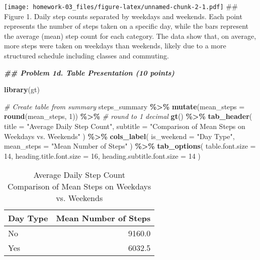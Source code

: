 \documentclass[
]{article}
\newenvironment{Shaded}{\begin{snugshade}}{\end{snugshade}}
\newcommand{\AttributeTok}[1]{\textcolor[rgb]{0.13,0.29,0.53}{#1}}
\newcommand{\CommentTok}[1]{\textcolor[rgb]{0.56,0.35,0.01}{\textit{#1}}}
\newcommand{\DecValTok}[1]{\textcolor[rgb]{0.00,0.00,0.81}{#1}}
\newcommand{\DocumentationTok}[1]{\textcolor[rgb]{0.56,0.35,0.01}{\textbf{\textit{#1}}}}
\newcommand{\FunctionTok}[1]{\textcolor[rgb]{0.13,0.29,0.53}{\textbf{#1}}}
\newcommand{\NormalTok}[1]{#1}
\newcommand{\SpecialCharTok}[1]{\textcolor[rgb]{0.81,0.36,0.00}{\textbf{#1}}}
\newcommand{\StringTok}[1]{\textcolor[rgb]{0.31,0.60,0.02}{#1}}
\begin{document}
\texttt{[image: homework-03\_files/figure-latex/unnamed-chunk-2-1.pdf]}
\#\# Figure 1. Daily step counts separated by weekdays and weekends.
Each point represents the number of steps taken on a specific day, while
the bars represent the average (mean) step count for each category. The
data show that, on average, more steps were taken on weekdays than
weekends, likely due to a more structured schedule including classes and
commuting.

\begin{Shaded}
\begin{Highlighting}[]
\DocumentationTok{\#\# Problem 1d. Table Presentation (10 points)}

\FunctionTok{library}\NormalTok{(gt)}

\CommentTok{\# Create table from summary}
\NormalTok{steps\_summary }\SpecialCharTok{\%\textgreater{}\%}
  \FunctionTok{mutate}\NormalTok{(}\AttributeTok{mean\_steps =} \FunctionTok{round}\NormalTok{(mean\_steps, }\DecValTok{1}\NormalTok{)) }\SpecialCharTok{\%\textgreater{}\%}  \CommentTok{\# round to 1 decimal}
  \FunctionTok{gt}\NormalTok{() }\SpecialCharTok{\%\textgreater{}\%}
  \FunctionTok{tab\_header}\NormalTok{(}
    \AttributeTok{title =} \StringTok{"Average Daily Step Count"}\NormalTok{,}
    \AttributeTok{subtitle =} \StringTok{"Comparison of Mean Steps on Weekdays vs. Weekends"}
\NormalTok{  ) }\SpecialCharTok{\%\textgreater{}\%}
  \FunctionTok{cols\_label}\NormalTok{(}
    \AttributeTok{is\_weekend =} \StringTok{"Day Type"}\NormalTok{,}
    \AttributeTok{mean\_steps =} \StringTok{"Mean Number of Steps"}
\NormalTok{  ) }\SpecialCharTok{\%\textgreater{}\%}
  \FunctionTok{tab\_options}\NormalTok{(}
    \AttributeTok{table.font.size =} \DecValTok{14}\NormalTok{,}
    \AttributeTok{heading.title.font.size =} \DecValTok{16}\NormalTok{,}
    \AttributeTok{heading.subtitle.font.size =} \DecValTok{14}
\NormalTok{  )}
\end{Highlighting}
\end{Shaded}

\begin{table}[!t]
\caption*{
{\large Average Daily Step Count} \\ 
{\small Comparison of Mean Steps on Weekdays vs. Weekends}
} 
\fontsize{10.5pt}{12.6pt}\selectfont
\begin{tabular*}{\linewidth}{@{\extracolsep{\fill}}lr}
\toprule
Day Type & Mean Number of Steps \\ 
\midrule\addlinespace[2.5pt]
No & 9160.0 \\ 
Yes & 6032.5 \\ 
\bottomrule
\end{tabular*}
\end{table}
\end{document}

